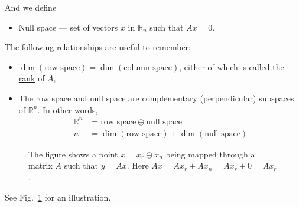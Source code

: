 \begin{enumerate}
    And we define
    \begin{itemize}
        \item Null space --- set of vectors $x$ in $\mathbb{R}_n$ such that $Ax=0$.
    \end{itemize}

    The following relationships are useful to remember:
    \begin{itemize}
        \item $\dim(\text{row space}) = \dim(\text{column space})$, either of which is called the \underline{rank} of $A$,
        \item The row space and null space are complementary (perpendicular) subspaces of $\mathbb{R}^n$. In other words, 
        \begin{align*}
            \mathbb{R}^n &= \text{row space}\oplus\text{null space} \\
            n &= \dim(\text{row space}) + \dim(\text{null space})
        \end{align*}
    \end{itemize}
    \begin{figure}[th]
        \caption{The figure shows a point $x = x_r \oplus x_n$ being mapped through a matrix $A$ such that $y=Ax$. Here $Ax = Ax_r + Ax_n = Ax_r + 0 = Ax_r$.}
        \label{fig:linear-1}
        \centering
        
    \end{figure}
    See Fig.~\ref{fig:linear-1} for an illustration. 


\end{enumerate}
